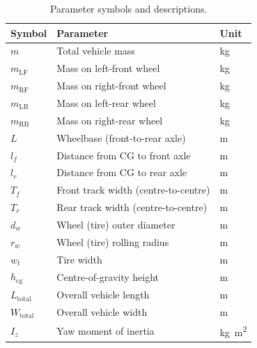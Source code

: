 \documentclass[a4paper,11pt]{article}
\begin{document}
\begin{table}[H]
\centering
\caption{Parameter symbols and descriptions.}
\label{tab:symbols}
\begin{tabular}{@{}lll@{}}
\toprule
\textbf{Symbol}    & \textbf{Parameter}                         & \textbf{Unit}\\
\midrule
$m$                & Total vehicle mass                         & \si{\kilo\gram}\\
$m_\text{LF}$      & Mass on left-front wheel                  & \si{\kilo\gram}\\
$m_\text{RF}$      & Mass on right-front wheel                 & \si{\kilo\gram}\\
$m_\text{LB}$      & Mass on left-rear wheel                   & \si{\kilo\gram}\\
$m_\text{RB}$      & Mass on right-rear wheel                  & \si{\kilo\gram}\\
$L$                & Wheelbase (front-to-rear axle)            & \si{\metre}\\
$l_f$              & Distance from CG to front axle            & \si{\metre}\\
$l_r$              & Distance from CG to rear axle             & \si{\metre}\\
$T_f$              & Front track width (centre-to-centre)      & \si{\metre}\\
$T_r$              & Rear track width (centre-to-centre)       & \si{\metre}\\
$d_w$              & Wheel (tire) outer diameter               & \si{\metre}\\
$r_w$              & Wheel (tire) rolling radius               & \si{\metre}\\
$w_t$              & Tire width                                & \si{\metre}\\
$h_\text{cg}$      & Centre-of-gravity height                  & \si{\metre}\\
$L_\text{total}$   & Overall vehicle length                    & \si{\metre}\\
$W_\text{total}$   & Overall vehicle width                     & \si{\metre}\\
$I_z$              & Yaw moment of inertia                     & \si{\kilo\gram\metre\squared}\\
\bottomrule
\end{tabular}
\end{table}

\end{document}
